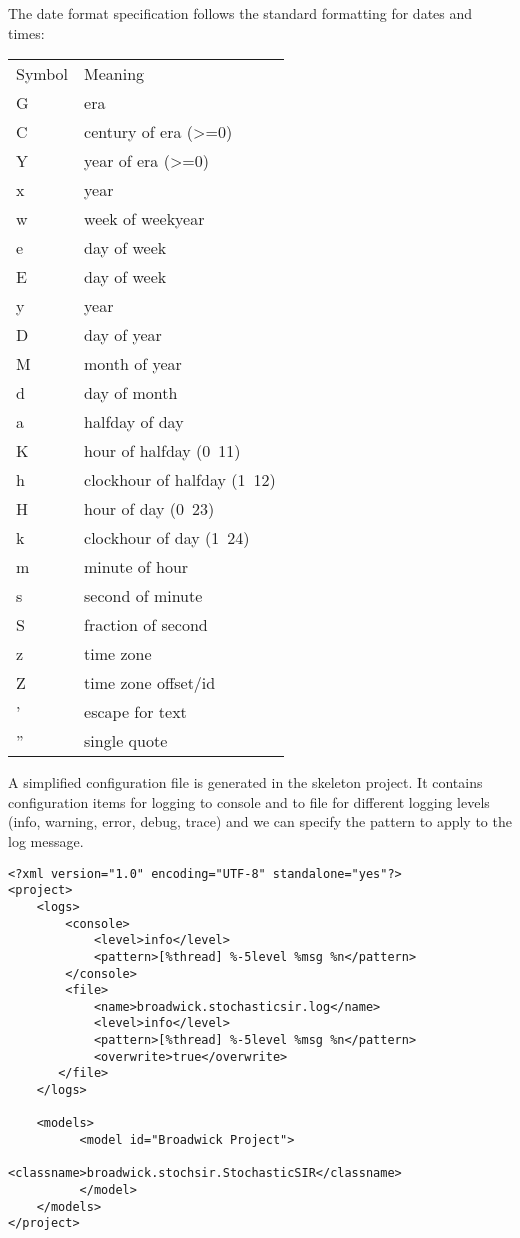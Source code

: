The date format specification follows the standard formatting for dates and times:

\begin{tabulary}{1.0\textwidth}{l p{10cm}}
\toprule
Symbol &Meaning              \\
 G     &era                  \\
 C     &century of era (>=0) \\
 Y     &year of era (>=0)    \\
 x     &year          \\
 w     &week of weekyear     \\
 e     &day of week          \\
 E     &day of week          \\
 y     &year                 \\
 D     &day of year          \\
 M     &month of year        \\
 d     &day of month         \\
 a     &halfday of day       \\
 K     &hour of halfday (0~11)      \\
 h     &clockhour of halfday (1~12) \\
 H     &hour of day (0~23)          \\
 k     &clockhour of day (1~24)     \\
 m     &minute of hour              \\
 s     &second of minute            \\
 S     &fraction of second          \\
 z     &time zone                   \\
 Z     &time zone offset/id         \\
 '     &escape for text             \\
 ''    &single quote                \\
\bottomrule
\end{tabulary}


A simplified configuration file is generated in the skeleton project. It contains configuration items for logging to console and to file for different logging levels (info, warning, error, debug, trace) and we can specify the pattern to apply to the log message.

\begin{sourcecode}
    \begin{verbatim}
<?xml version="1.0" encoding="UTF-8" standalone="yes"?>
<project>
    <logs>
        <console>
            <level>info</level>
            <pattern>[%thread] %-5level %msg %n</pattern>
        </console>
        <file>
            <name>broadwick.stochasticsir.log</name>
            <level>info</level>
            <pattern>[%thread] %-5level %msg %n</pattern>
            <overwrite>true</overwrite>
       </file>
    </logs>

    <models>
          <model id="Broadwick Project">
                 <classname>broadwick.stochsir.StochasticSIR</classname>
          </model>
    </models>
</project>
\end{verbatim}
\end{sourcecode}

